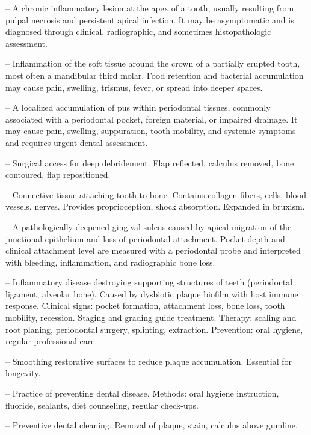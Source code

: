 -- A chronic inflammatory lesion at the apex of a tooth, usually resulting from pulpal necrosis and persistent apical infection. It may be asymptomatic and is diagnosed through clinical, radiographic, and sometimes histopathologic assessment.

-- Inflammation of the soft tissue around the crown of a partially erupted tooth, most often a mandibular third molar. Food retention and bacterial accumulation may cause pain, swelling, trismus, fever, or spread into deeper spaces.

-- A localized accumulation of pus within periodontal tissues, commonly associated with a periodontal pocket, foreign material, or impaired drainage. It may cause pain, swelling, suppuration, tooth mobility, and systemic symptoms and requires urgent dental assessment.

-- Surgical access for deep debridement. Flap reflected, calculus removed, bone contoured, flap repositioned.

-- Connective tissue attaching tooth to bone. Contains collagen fibers, cells, blood vessels, nerves. Provides proprioception, shock absorption. Expanded in bruxism.

-- A pathologically deepened gingival sulcus caused by apical migration of the junctional epithelium and loss of periodontal attachment. Pocket depth and clinical attachment level are measured with a periodontal probe and interpreted with bleeding, inflammation, and radiographic bone loss.

-- Inflammatory disease destroying supporting structures of teeth (periodontal ligament, alveolar bone). Caused by dysbiotic plaque biofilm with host immune response. Clinical signs: pocket formation, attachment loss, bone loss, tooth mobility, recession. Staging and grading guide treatment. Therapy: scaling and root planing, periodontal surgery, splinting, extraction. Prevention: oral hygiene, regular professional care.

-- Smoothing restorative surfaces to reduce plaque accumulation. Essential for longevity.

-- Practice of preventing dental disease. Methods: oral hygiene instruction, fluoride, sealants, diet counseling, regular check-ups.

-- Preventive dental cleaning. Removal of plaque, stain, calculus above gumline.

